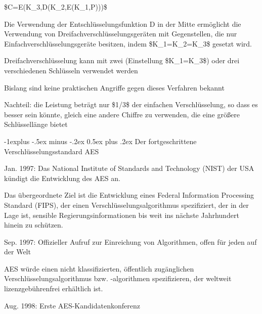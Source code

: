 \documentclass[a4paper]{article}
\makeatletter
\renewcommand{\subsection}{\@startsection{subsection}{2}{0mm}%
 {-1explus -.5ex minus -.2ex}%
 {0.5ex plus .2ex}%
 {\normalfont\normalsize\bfseries}}
\makeatother
\begin{document}
\begin{multicols}{3}
\begin{itemize*}
            \begin{itemize*}
                  \item \$C=E(K\_3,D(K\_2,E(K\_1,P)))\$
                  \item Die Verwendung der Entschlüsselungsfunktion D in der Mitte ermöglicht die Verwendung von Dreifachverschlüsselungsgeräten mit Gegenstellen, die nur Einfachverschlüsselungsgeräte besitzen, indem \$K\_1=K\_2=K\_3\$ gesetzt wird.
                  \item Dreifachverschlüsselung kann mit zwei (Einstellung \$K\_1=K\_3\$) oder drei verschiedenen Schlüsseln verwendet werden
                  \item Bislang sind keine praktischen Angriffe gegen dieses Verfahren bekannt
                  \item Nachteil: die Leistung beträgt nur \$1/3\$ der einfachen Verschlüsselung, so dass es besser sein könnte, gleich eine andere Chiffre zu verwenden, die eine größere Schlüssellänge bietet
            \end{itemize*}
      \end{itemize*}


      \subsection{Der fortgeschrittene Verschlüsselungsstandard
            AES}

      \begin{itemize*}
            \item
            Jan. 1997: Das National Institute of Standards and Technology (NIST)
            der USA kündigt die Entwicklung des AES an.

            \begin{itemize*}
                  \item Das übergeordnete Ziel ist die Entwicklung eines Federal Information Processing Standard (FIPS), der einen Verschlüsselungsalgorithmus spezifiziert, der in der Lage ist, sensible Regierungsinformationen bis weit ins nächste Jahrhundert hinein zu schützen.
            \end{itemize*}
            \item
            Sep. 1997: Offizieller Aufruf zur Einreichung von Algorithmen, offen
            für jeden auf der Welt

            \begin{itemize*}
                  \item AES würde einen nicht klassifizierten, öffentlich zugänglichen Verschlüsselungsalgorithmus bzw. -algorithmen spezifizieren, der weltweit lizenzgebührenfrei erhältlich ist.
            \end{itemize*}
            \item
            Aug. 1998: Erste AES-Kandidatenkonferenz


\end{itemize*}
\end{multicols}
\end{document}
